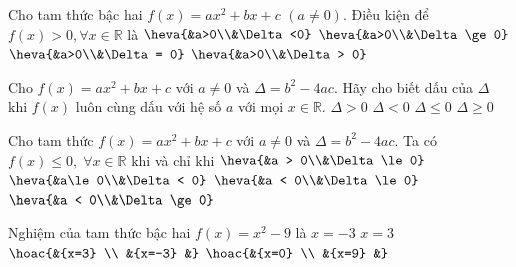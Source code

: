 \begin{ex}%
	Cho tam thức bậc hai $f(x)=ax^2+b x+c$ $(a \neq 0)$.  Điều kiện để $f(x)>0, \forall x \in \mathbb{R}$ là
	\choice 
		{\True $\heva{&a>0\\&\Delta<0}$} 
		 {$\heva{&a>0\\&\Delta\ge 0}$}
		{$\heva{&a>0\\&\Delta= 0}$} 
		 {$\heva{&a>0\\&\Delta> 0}$}
\end{ex}

\begin{ex}%
	Cho $f(x)=ax^2+bx+c$ với $a\ne 0$ và $\Delta=b^2-4ac$. Hãy cho biết dấu của $\Delta$ khi $f(x)$ luôn cùng dấu với hệ số $a$ với  mọi $x\in \mathbb{R}$.
	\choice 
		 {$\Delta > 0$}
		{\True $\Delta < 0$} 
		{$\Delta \le  0$}
		{$\Delta  \ge 0$}
\end{ex}

\begin{ex}%
	Cho tam thức $f(x)=ax^2+bx+c$ với $a\ne 0$ và $\Delta=b^2-4ac$. Ta có  $f(x)\le 0, \; \forall x \in \mathbb{R}$ khi và chỉ khi
	\choice 
		 {$\heva{&a > 0\\&\Delta\le 0}$}
		{$\heva{&a\le 0\\&\Delta < 0}$} 
		{\True $\heva{&a  < 0\\&\Delta\le 0}$}
		 {$\heva{&a < 0\\&\Delta\ge 0}$}
\end{ex}

\begin{ex}%
	Nghiệm của tam thức bậc hai $f(x)=x^2-9$  là
	\choice 
		{$x=-3$} 
		 {$x=3$}
		{\True  $\hoac{&{x=3} \\
		 &{x=-3}
		&}$} 
		{$\hoac{&{x=0} \\ 
		&{x=9} 
		 &}$}
\end{ex}

